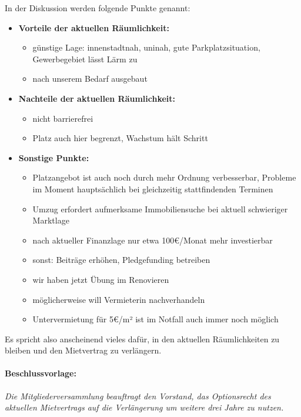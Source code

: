 \documentclass[a4paper,12pt]{scrartcl}
\begin{document}
In der Diskussion werden folgende Punkte genannt:
\begin{itemize}
  \item \textbf{Vorteile der aktuellen Räumlichkeit:}
  \begin{itemize}
    \item günstige Lage: innenstadtnah, uninah, gute Parkplatzsituation,
      Gewerbegebiet lässt Lärm zu
    \item nach unserem Bedarf ausgebaut
  \end{itemize}

  \item \textbf{Nachteile der aktuellen Räumlichkeit:}
  \begin{itemize}
    \item nicht barrierefrei
    \item Platz auch hier begrenzt, Wachstum hält Schritt
  \end{itemize}

  \item \textbf{Sonstige Punkte:}
  \begin{itemize}
    \item Platzangebot ist auch noch durch mehr Ordnung verbesserbar, Probleme
      im Moment hauptsächlich bei gleichzeitig stattfindenden Terminen
    \item Umzug erfordert aufmerksame Immobiliensuche bei aktuell schwieriger
      Marktlage
    \item nach aktueller Finanzlage nur etwa 100€/Monat mehr investierbar
    \item sonst: Beiträge erhöhen, Pledgefunding betreiben
    \item wir haben jetzt Übung im Renovieren
    \item möglicherweise will Vermieterin nachverhandeln
    \item Untervermietung für 5€/m² ist im Notfall auch immer noch möglich
  \end{itemize}
\end{itemize}

Es spricht also anscheinend vieles dafür, in den aktuellen Räumlichkeiten zu
bleiben und den Mietvertrag zu verlängern.

\paragraph{Beschlussvorlage:} \emph{Die Mitgliederversammlung beauftragt den
Vorstand, das Optionsrecht des aktuellen Mietvertrags auf die Verlängerung um
weitere drei Jahre zu nutzen.}
\end{document}
